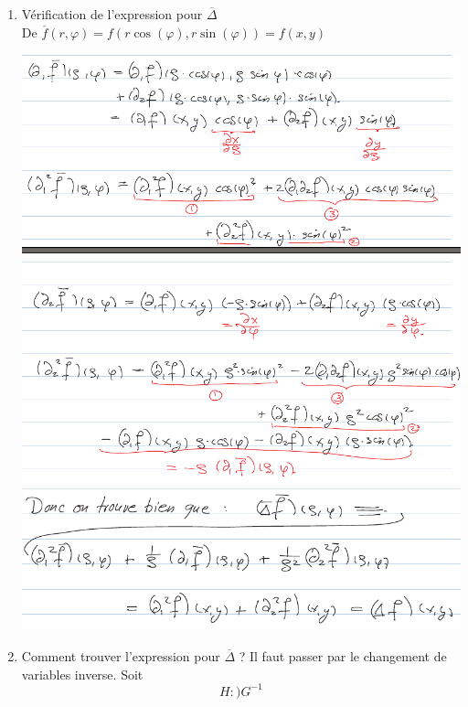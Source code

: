 \documentclass[12pt,a4paper]{article}
\begin{document}
\begin{enumerate}[label=\roman*)]
	\item 	Vérification de l'expression pour $\overline{\Delta}$\\
			De $\overline{f}(r,\varphi) = f(r\cos(\varphi),r\sin(\varphi)) = f(x,y)$
			\begin{center}
				\includegraphics[scale=0.7]{images/deriv_delta}
				\includegraphics[scale=0.7]{images/donc_on_trouve_bien}
			\end{center}
	\item 	Comment trouver l'expression pour $\overline{\Delta}$ ? Il faut passer par le changement de variables inverse. Soit 
			\begin{equation*}
				H :) G^{-1}
			\end{equation*}
			\begin{center}

\end{center}
\end{enumerate}
\end{document}
